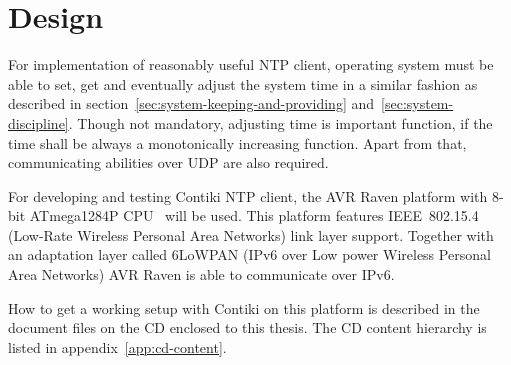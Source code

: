 
\chapter{Design}
For implementation of reasonably useful NTP client,
operating system must be able to set, get
and eventually adjust the system time in a similar fashion as
described in section~\ref{sec:system-keeping-and-providing} and~\ref{sec:system-discipline}.
Though not mandatory, adjusting time is important function,
if the time shall be always a monotonically increasing function.
Apart from that, communicating abilities over UDP are also required.

For developing and testing Contiki NTP client,
the AVR Raven platform with 8-bit ATmega1284P CPU~\cite{avr-datasheet} will be used.
This platform features IEEE~802.15.4 (Low-Rate Wireless Personal Area Networks) link layer support.
Together with an adaptation layer called 6LoWPAN (IPv6 over Low power Wireless Personal Area Networks)
AVR Raven is able to communicate over IPv6.

How to get a working setup with Contiki on this platform is described in
the document files on the CD enclosed to this thesis.
The CD content hierarchy is listed in appendix~\ref{app:cd-content}.








%
